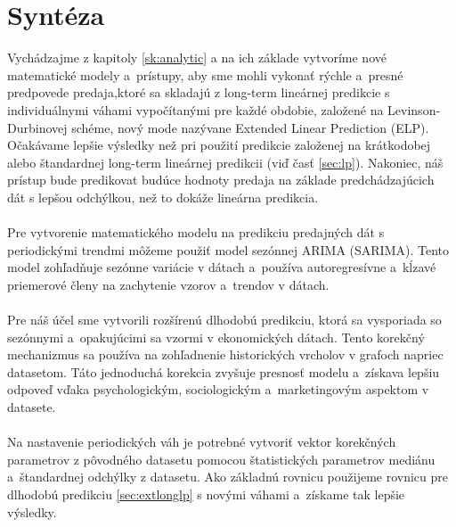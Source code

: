     \section{Syntéza}
    Vychádzajme z kapitoly \ref{sk:analytic} a na ich základe vytvoríme nové matematické modely a~prístupy, aby sme mohli
    vykonať rýchle a~presné predpovede predaja,ktoré sa skladajú z long-term lineárnej predikcie s individuálnymi
    váhami vypočítanými pre každé obdobie, založené na Levinson-Durbinovej schéme, nový mode nazývane Extended Linear
    Prediction (ELP). Očakávame lepšie výsledky než pri použití predikcie založenej na krátkodobej alebo štandardnej
    long-term lineárnej predikcii (viď časť \ref{sec:lp}). Nakoniec, náš prístup bude predikovat budúce hodnoty predaja
    na základe predchádzajúcich dát s lepšou odchýlkou, než to dokáže lineárna predikcia.\\
    \\
    Pre vytvorenie matematického modelu na predikciu predajných dát s periodickými trendmi môžeme použiť model
    sezónnej ARIMA (SARIMA). Tento model zohľadňuje sezónne variácie v dátach a~používa autoregresívne a~kĺzavé
    priemerové členy na zachytenie vzorov a~trendov v dátach.\\
    \\
    Pre náš účel sme vytvorili rozšírenú dlhodobú predikciu, ktorá sa vysporiada so sezónnymi a~opakujúcimi sa vzormi
    v ekonomických dátach. Tento korekčný mechanizmus sa používa na zohľadnenie historických vrcholov v grafoch
    napriec datasetom. Táto jednoduchá korekcia zvyšuje presnosť modelu a~získava lepšiu odpoveď
    vďaka psychologickým, sociologickým a~marketingovým aspektom v datasete.\\
    \\
    Na nastavenie periodických váh je potrebné vytvoriť vektor korekčných parametrov z pôvodného datasetu pomocou
    štatistických parametrov mediánu a~štandardnej odchýlky z datasetu. Ako základnú rovnicu použijeme rovnicu pre
    dlhodobú predikciu \ref{sec:extlonglp} s novými váhami a~získame tak lepšie výsledky.

